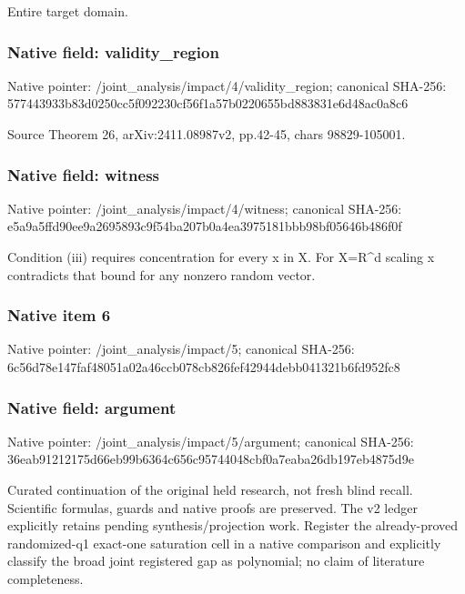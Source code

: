 \documentclass[10pt,a4paper]{article}
\begin{document}
\begingroup\raggedright\sloppy Entire target domain.\par\endgroup

\subsubsection{Native field: validity\_\allowbreak{}region}
Native pointer: /joint\_\allowbreak{}analysis/impact/4/validity\_\allowbreak{}region; canonical SHA-256: 577443933b83d0250cc5f092230cf56f1a57b0220655bd883831e6d48ac0a8c6

\begingroup\raggedright\sloppy Source Theorem 26,\allowbreak{} arXiv:\allowbreak{}2411.08987v2,\allowbreak{} pp.42-45,\allowbreak{} chars 98829-105001.\par\endgroup

\subsubsection{Native field: witness}
Native pointer: /joint\_\allowbreak{}analysis/impact/4/witness; canonical SHA-256: e5a9a5ffd90ee9a2695893c9f54ba207b0a4ea3975181bbb98bf05646b486f0f

\begingroup\raggedright\sloppy Condition (iii) requires concentration for every x in X. For X=\allowbreak{}R\textasciicircum{}d scaling x contradicts that bound for any nonzero random vector.\par\endgroup

\subsubsection{Native item 6}
Native pointer: /joint\_\allowbreak{}analysis/impact/5; canonical SHA-256: 6c56d78e147faf48051a02a46ccb078cb826fef42944debb041321b6fd952fc8

\subsubsection{Native field: argument}
Native pointer: /joint\_\allowbreak{}analysis/impact/5/argument; canonical SHA-256: 36eab91212175d66eb99b6364c656c95744048cbf0a7eaba26db197eb4875d9e

\begingroup\raggedright\sloppy Curated continuation of the original held research,\allowbreak{} not fresh blind recall. Scientific formulas,\allowbreak{} guards and native proofs are preserved. The v2 ledger explicitly retains pending synthesis/\allowbreak{}projection work. Register the already-proved randomized-q1 exact-one saturation cell in a native comparison and explicitly classify the broad joint registered gap as polynomial;\allowbreak{} no claim of literature completeness.\par\endgroup
\end{document}
